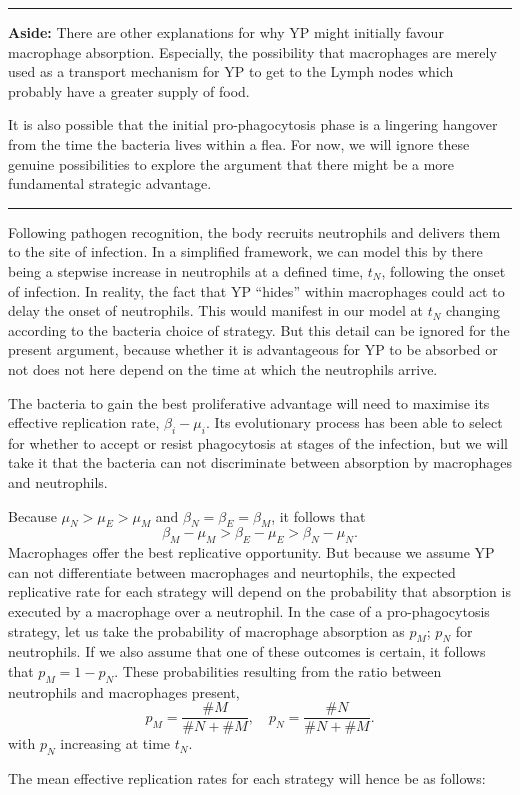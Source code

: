 \vspace{10pt}
\hrule
\vspace{10pt}

\noindent
\textbf{Aside:}  There are other explanations for why YP might initially favour macrophage absorption. Especially, the possibility that macrophages are merely used as a transport mechanism for YP to get to the Lymph nodes which probably have a greater supply of food.\par
It is also possible that the initial pro-phagocytosis phase is a lingering hangover from the time the bacteria lives within a flea. 
For now, we will ignore these genuine possibilities to explore the argument that there might be a more fundamental strategic advantage. 

\vspace{10pt}
\hrule
\vspace{10pt}

\noindent
Following pathogen recognition, the body recruits neutrophils and delivers them to the site of infection. In a simplified framework, we can model this by there being a stepwise increase in neutrophils at a defined time, $t_N$, following the onset of infection. In reality, the fact that YP ``hides'' within macrophages could act to delay the onset of neutrophils. This would manifest in our model at $t_N$ changing according to the bacteria choice of strategy. But this detail can be ignored for the present argument, because whether it is advantageous for YP to be absorbed or not does not here depend on the time at which the neutrophils arrive. 


The bacteria to gain the best proliferative advantage will need to maximise its effective replication rate, $\beta_i - \mu_i$. Its evolutionary process has been able to select for whether to accept or resist phagocytosis at stages of the infection, but we will take it that the bacteria can not discriminate between absorption by macrophages and neutrophils. 


Because  $\mu_N > \mu_E > \mu_M$ and $\beta_N = \beta _E = \beta_M$, it follows that
$$\beta_M -  \mu_M > \beta_E -  \mu_E >  \beta_N - \mu_N.$$
Macrophages offer the best replicative opportunity. But because we assume YP can not differentiate between macrophages and neurtophils, the expected replicative rate for each strategy will depend on the probability that absorption is executed by a macrophage over a neutrophil. In the case of a pro-phagocytosis strategy, let us take the probability of macrophage absorption as $p_M$; $p_N$ for neutrophils. If we also assume that one of these outcomes is certain, it follows that $p_M = 1 - p_N$. These probabilities resulting from the ratio between neutrophils and macrophages present, 
$$p_M = \frac{\# M}{ \#N + \#M}, \quad p_N = \frac{\# N}{ \#N + \#M}.$$
with $p_N$ increasing at time $t_N$. \par
The mean effective replication rates for each strategy will hence be as follows:

